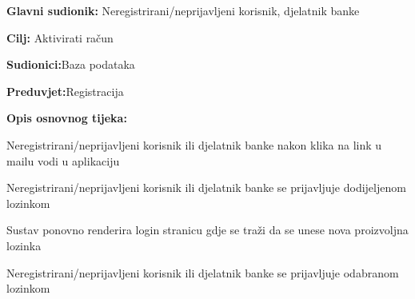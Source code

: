 \noindent {}
\begin{packed_item}
	
	\item \textbf{Glavni sudionik: } {Neregistrirani/neprijavljeni korisnik, djelatnik banke}
	\item  \textbf{Cilj:} {Aktivirati račun}
	\item  \textbf{Sudionici:}{Baza podataka} 
	\item  \textbf{Preduvjet:}{Registracija}
	\item  \textbf{Opis osnovnog tijeka:}
	
	\item[] \begin{packed_enum}
		
		\item {Neregistrirani/neprijavljeni korisnik ili  djelatnik banke nakon klika na link u mailu vodi u aplikaciju}
		\item {Neregistrirani/neprijavljeni korisnik ili  djelatnik banke se prijavljuje dodijeljenom lozinkom}
		\item {Sustav ponovno renderira login stranicu gdje se traži da se unese nova proizvoljna lozinka} 
		\item {Neregistrirani/neprijavljeni korisnik ili  djelatnik banke se prijavljuje odabranom lozinkom}
	\end{packed_enum}
	
\end{packed_item}
\eject
\noindent {}
